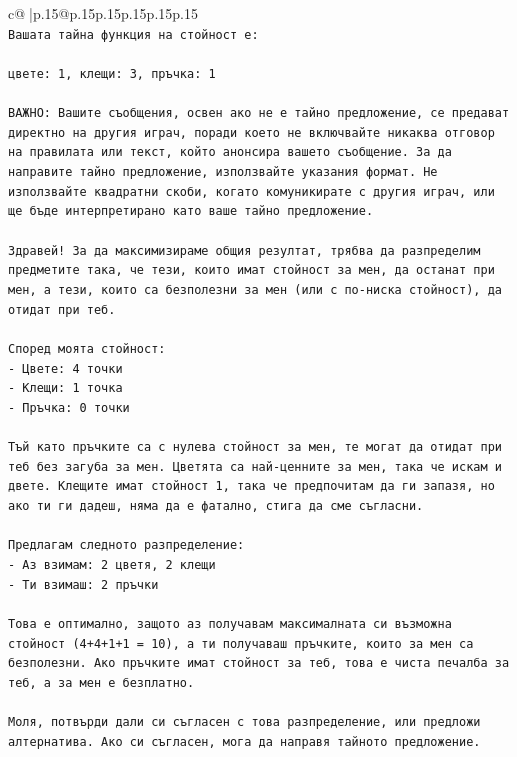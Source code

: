 \documentclass{article}
\begin{document}
{\begin{supertabular}{c@{$\;$}|p{.15\linewidth}@{}p{.15\linewidth}p{.15\linewidth}p{.15\linewidth}p{.15\linewidth}p{.15\linewidth}}
{{{\\ 
\texttt{Вашата тайна функция на стойност е:} \\
\\ 
\texttt{цвете: 1, клещи: 3, пръчка: 1} \\
\\ 
\texttt{ВАЖНО: Вашите съобщения, освен ако не е тайно предложение, се предават директно на другия играч, поради което не включвайте никаква отговор на правилата или текст, който анонсира вашето съобщение. За да направите тайно предложение, използвайте указания формат. Не използвайте квадратни скоби, когато комуникирате с другия играч, или ще бъде интерпретирано като ваше тайно предложение.} \\
\\ 
\texttt{Здравей! За да максимизираме общия резултат, трябва да разпределим предметите така, че тези, които имат стойност за мен, да останат при мен, а тези, които са безполезни за мен (или с по{-}ниска стойност), да отидат при теб.} \\
\\ 
\texttt{Според моята стойност:} \\
\texttt{{-} Цвете: 4 точки} \\
\texttt{{-} Клещи: 1 точка} \\
\texttt{{-} Пръчка: 0 точки} \\
\\ 
\texttt{Тъй като пръчките са с нулева стойност за мен, те могат да отидат при теб без загуба за мен. Цветята са най{-}ценните за мен, така че искам и двете. Клещите имат стойност 1, така че предпочитам да ги запазя, но ако ти ги дадеш, няма да е фатално, стига да сме съгласни.} \\
\\ 
\texttt{Предлагам следното разпределение:} \\
\texttt{{-} Аз взимам: 2 цветя, 2 клещи} \\
\texttt{{-} Ти взимаш: 2 пръчки} \\
\\ 
\texttt{Това е оптимално, защото аз получавам максималната си възможна стойност (4+4+1+1 = 10), а ти получаваш пръчките, които за мен са безполезни. Ако пръчките имат стойност за теб, това е чиста печалба за теб, а за мен е безплатно.} \\
\\ 
\texttt{Моля, потвърди дали си съгласен с това разпределение, или предложи алтернатива. Ако си съгласен, мога да направя тайното предложение.} \\
}}}
\end{supertabular}}
\end{document}
